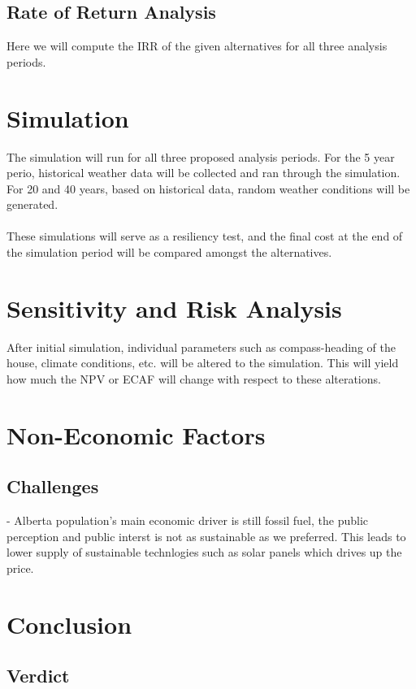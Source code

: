 \documentclass[10pt,letterpaper]{article}
\begin{document}
\subsection{Rate of Return Analysis}\label{subsection:rate-of-return}
Here we will compute the IRR of the given alternatives for all three analysis periods.\\

\section{Simulation}

The simulation will run for all three proposed analysis periods. For the 5 year perio, historical weather data will be collected and ran through the simulation. For 20 and 40 years, based on historical data, random weather conditions will be generated.\\
\\
These simulations will serve as a resiliency test, and the final cost at the end of the simulation period will be compared amongst the alternatives.\\

\section{Sensitivity and Risk Analysis}

After initial simulation, individual parameters such as compass-heading of the house, climate conditions, etc. will be altered to the simulation. This will yield how much the NPV or ECAF will change with respect to these alterations.\\

\section{Non-Economic Factors}
\subsection{Challenges}
- Alberta population's main economic driver is still fossil fuel, the public perception and public interst is not as sustainable as we preferred. This leads to lower supply of sustainable technlogies such as solar panels which drives up the price.\\

\section{Conclusion}\label{section:conclusion}

\subsection{Verdict}

\clearpage
{}


\end{document}

